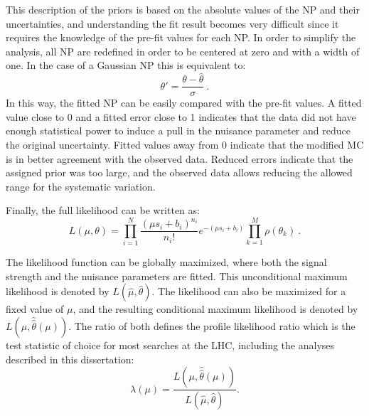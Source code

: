     This description of the priors is based on the absolute values of the NP and their uncertainties, and understanding the fit result becomes very difficult since it requires the knowledge of the pre-fit values for each NP.
    In order to simplify the analysis, all NP are redefined in order to be centered at zero and with a width of one. In the case of a Gaussian NP this is equivalent to: 
    \begin{equation}
      \theta' = \frac{\theta-\hat{\theta}}{\sigma}~.
      \label{eq:np_redefinition}
    \end{equation}
    In this way, the fitted NP can be easily compared with the pre-fit values. 
    A fitted value close to 0 and a fitted error close to 1 indicates that the
    data did not have enough statistical power to induce a pull in the nuisance parameter and reduce the original uncertainty.
    Fitted values away from 0 indicate that the modified MC is in better agreement with the observed data. 
    Reduced errors indicate that the assigned prior was too large, and the observed data allows reducing the allowed range for the systematic variation.


    Finally, the full likelihood can be written as:
    \begin{equation}
      \label{eq:likelihood}
      L(\mu,\theta)=\prod_{i=1}^{N}\frac{(\mu s_i+b_i)^{n_i}}{n_i !}e^{-(\mu s_i+b_i)} \prod_{k=1}^{M}\rho(\theta_k)~.
    \end{equation}

    The likelihood function can be globally maximized, where both the signal strength and the nuisance parameters are fitted. This unconditional maximum likelihood is denoted by $L(\hat{\mu},\hat{\theta})$. The likelihood can also be maximized for a fixed value of $\mu$, and the resulting conditional maximum likelihood is denoted by $L(\mu,\hat{\hat{\theta}}(\mu))$.     
    The ratio of both defines the profile likelihood ratio which is the test statistic of choice for most searches at the LHC, including the analyses described in this dissertation:
    \begin{equation}
      \label{eq:profileL}
      \lambda(\mu)=\frac{L(\mu,\hat{\hat{\theta}}(\mu))}{L(\hat{\mu},\hat{\theta})}.
    \end{equation}

